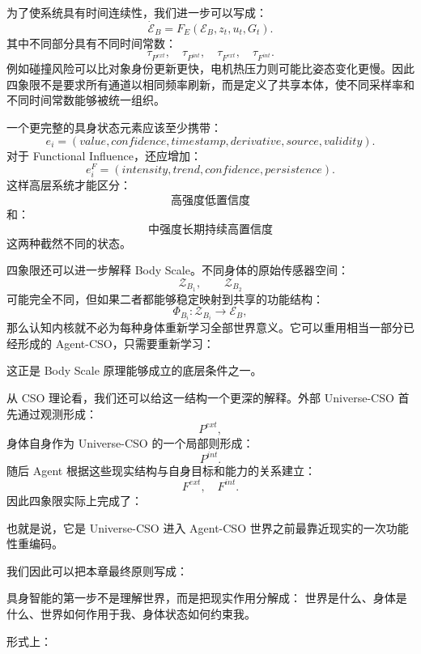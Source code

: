 为了使系统具有时间连续性，我们进一步可以写成：
\[
\dot{\mathcal E}_B
=
F_E(
\mathcal E_B,
z_t,
u_t,
G_t
).
\]
其中不同部分具有不同时间常数：
\[
\tau_{P^{ext}},
\quad
\tau_{P^{int}},
\quad
\tau_{F^{ext}},
\quad
\tau_{F^{int}}.
\]
例如碰撞风险可以比对象身份更新更快，电机热压力则可能比姿态变化更慢。因此四象限不是要求所有通道以相同频率刷新，而是定义了共享本体，使不同采样率和不同时间常数能够被统一组织。

一个更完整的具身状态元素应该至少携带：
\[
e_i
=
(
value,
confidence,
timestamp,
derivative,
source,
validity
).
\]
对于 Functional Influence，还应增加：
\[
e_i^F
=
(
intensity,
trend,
confidence,
persistence
).
\]
这样高层系统才能区分：
\[
\text{高强度低置信度}
\]
和：
\[
\text{中强度长期持续高置信度}
\]
这两种截然不同的状态。

四象限还可以进一步解释 Body Scale。不同身体的原始传感器空间：
\[
\mathcal Z_{B_1},
\qquad
\mathcal Z_{B_2}
\]
可能完全不同，但如果二者都能够稳定映射到共享的功能结构：
\[
\Phi_{B_i}:
\mathcal Z_{B_i}
\rightarrow
\mathcal E_B,
\]
那么认知内核就不必为每种身体重新学习全部世界意义。它可以重用相当一部分已经形成的 Agent-CSO，只需要重新学习：
\begin{statementbox}
\centering
{}
\end{statementbox}
这正是 Body Scale 原理能够成立的底层条件之一。

从 CSO 理论看，我们还可以给这一结构一个更深的解释。外部 Universe-CSO 首先通过观测形成：
\[
P^{ext},
\]
身体自身作为 Universe-CSO 的一个局部则形成：
\[
P^{int}.
\]
随后 Agent 根据这些现实结构与自身目标和能力的关系建立：
\[
F^{ext},
\quad
F^{int}.
\]
因此四象限实际上完成了：
\begin{statementbox}
\centering
{}
\end{statementbox}
也就是说，它是 Universe-CSO 进入 Agent-CSO 世界之前最靠近现实的一次功能性重编码。

我们因此可以把本章最终原则写成：
\begin{proposition*}
具身智能的第一步不是理解世界，而是把现实作用分解成：
世界是什么、身体是什么、世界如何作用于我、身体状态如何约束我。
\end{proposition*}

形式上：
\begin{statementbox}
\centering
{}
\end{statementbox}

